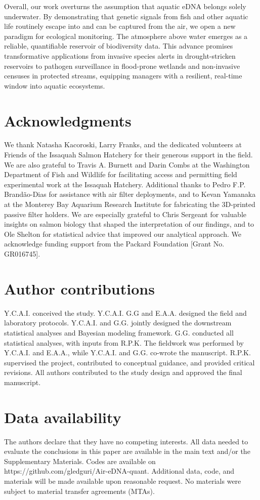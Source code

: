 \documentclass{article}
\begin{document}
Overall, our work overturns the assumption that aquatic eDNA belongs solely underwater. By demonstrating that genetic signals from fish and other aquatic life routinely escape into and can be captured from the air, we open a new paradigm for ecological monitoring. The atmosphere above water emerges as a reliable, quantifiable reservoir of biodiversity data. This advance promises transformative applications from invasive species alerts in drought-stricken reservoirs to pathogen surveillance in flood-prone wetlands and non-invasive censuses in protected streams, equipping managers with a resilient, real-time window into aquatic ecosystems.

\section*{Acknowledgments}
We thank Natasha Kacoroski, Larry Franks, and the dedicated volunteers at Friends of the Issaquah Salmon Hatchery for their generous support in the field. We are also grateful to Travis A. Burnett and Darin Combs at the Washington Department of Fish and Wildlife for facilitating access and permitting field experimental work at the Issaquah Hatchery. Additional thanks to Pedro F.P. Brandão-Dias for assistance with air filter deployments, and to Kevan Yamanaka at the Monterey Bay Aquarium Research Institute for fabricating the 3D-printed passive filter holders. We are especially grateful to Chris Sergeant for valuable insights on salmon biology that shaped the interpretation of our findings, and to Ole Shelton for statistical advice that improved our analytical approach. We acknowledge funding support from the Packard Foundation [Grant No. GR016745].

\section*{Author contributions}
Y.C.A.I. conceived the study. Y.C.A.I. G.G and E.A.A. designed the field and laboratory protocols. Y.C.A.I. and G.G. jointly designed the downstream statistical analyses and Bayesian modeling framework. G.G. conducted all statistical analyses, with inputs from R.P.K. The fieldwork was performed by Y.C.A.I. and E.A.A., while Y.C.A.I. and G.G. co-wrote the manuscript. R.P.K. supervised the project, contributed to conceptual guidance, and provided critical revisions. All authors contributed to the study design and approved the final manuscript.  

\section*{Data availability}
The authors declare that they have no competing interests. All data needed to evaluate the conclusions in this paper are available in the main text and/or the Supplementary Materials. Codes are available on https://github.com/gledguri/Air-eDNA-quant. Additional data, code, and materials will be made available upon reasonable request. No materials were subject to material transfer agreements (MTAs).

\clearpage

\end{document}
